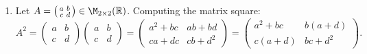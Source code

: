 \begin{exercisesolution}
\label{sol:matrix_powers_2x2}
\begin{enumerate}[label=\textbf{(\alph*)}]
    \item Let $A = \left(\begin{smallmatrix} a & b \\ c & d \end{smallmatrix}\right) \in \M_{2 \times 2}(\mathbb{R})$.
    Computing the matrix square:
    \[
    A^2 = \begin{pmatrix} a & b \\ c & d \end{pmatrix} \begin{pmatrix} a & b \\ c & d \end{pmatrix} = \begin{pmatrix} a^2 + bc & ab + bd \\ ca + dc & cb + d^2 \end{pmatrix} = \begin{pmatrix} a^2 + bc & b(a + d) \\ c(a + d) & bc + d^2 \end{pmatrix}.
    \]


\end{enumerate}
\end{exercisesolution}
